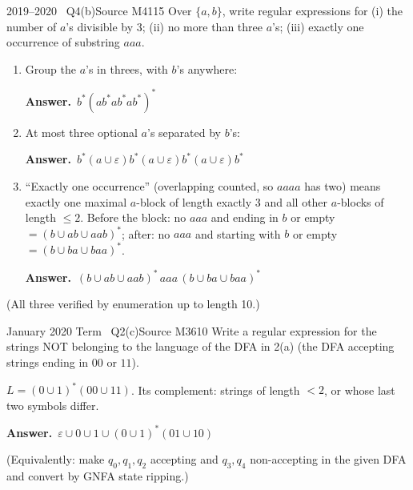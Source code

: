 \documentclass[11pt,a4paper]{article}
\newcommand{\eps}{\varepsilon}
\newcommand{\ans}[1]{\par\smallskip\noindent\colorbox{mist}{\parbox{\dimexpr\linewidth-2\fboxsep}{\sffamily\small\textbf{\color{teal}Answer.}\ \color{ink}#1}}\par}
\begin{document}
\begin{question}{2019--2020 \textbullet\ Q4(b)}{Source M41}{15}
Over $\{a,b\}$, write regular expressions for (i) the number of $a$'s divisible by 3; (ii) no more than three $a$'s; (iii) exactly one occurrence of substring $aaa$.
\end{question}
\begin{solution}
\begin{enumerate}
\item Group the $a$'s in threes, with $b$'s anywhere: \ans{$b^*(ab^*ab^*ab^*)^*$}
\item At most three optional $a$'s separated by $b$'s: \ans{$b^*(a\cup\eps)b^*(a\cup\eps)b^*(a\cup\eps)b^*$}
\item ``Exactly one occurrence'' (overlapping counted, so $aaaa$ has two) means exactly one maximal $a$-block of length exactly 3 and all other $a$-blocks of length $\le2$. Before the block: no $aaa$ and ending in $b$ or empty $=(b\cup ab\cup aab)^*$; after: no $aaa$ and starting with $b$ or empty $=(b\cup ba\cup baa)^*$.
\ans{$(b\cup ab\cup aab)^*\,aaa\,(b\cup ba\cup baa)^*$}
\end{enumerate}
(All three verified by enumeration up to length 10.)
\end{solution}

\begin{question}{January 2020 Term \textbullet\ Q2(c)}{Source M36}{10}
Write a regular expression for the strings NOT belonging to the language of the DFA in 2(a) (the DFA accepting strings ending in $00$ or $11$).
\end{question}
\begin{solution}
$L=(0\cup1)^*(00\cup11)$. Its complement: strings of length $<2$, or whose last two symbols differ.
\ans{$\eps\cup0\cup1\cup(0\cup1)^*(01\cup10)$}
(Equivalently: make $q_0,q_1,q_2$ accepting and $q_3,q_4$ non-accepting in the given DFA and convert by GNFA state ripping.)
\end{solution}
\end{document}
